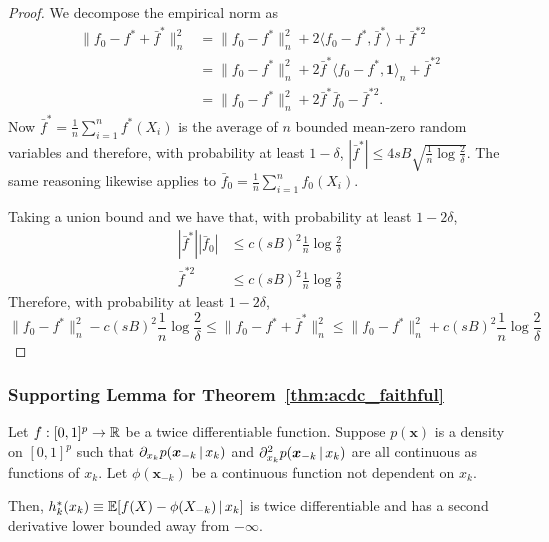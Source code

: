 \begin{proof}
We decompose the empirical norm as
\begin{align*}
\| f_0 - f^* + \bar{f}^* \|_n^2 &= \| f_0 - f^* \|_n^2 
    + 2 \langle f_0 - f^*, \bar{f}^* \rangle + \bar{f}^{*2} \\
  &= \| f_0 - f^* \|_n^2 + 2 \bar{f}^* \langle f_0 - f^*, \mathbf{1} \rangle_n + 
    \bar{f}^{*2} \\
  &= \| f_0 - f^* \|_n^2 + 2 \bar{f}^* \bar{f}_0 - \bar{f}^{*2}.
\end{align*}
Now
$\bar{f}^* = \frac{1}{n} \sum_{i=1}^n f^*(X_i)$ is the average of $n$ bounded mean-zero random variables and therefore, with probability at least $1-\delta$, $| \bar{f}^* | \leq 4 sB \sqrt{ \frac{1}{n} \log \frac{2}{\delta} }$.
The same reasoning likewise applies to $\bar{f}_0 = \frac{1}{n} \sum_{i=1}^n f_0(X_i)$.

Taking a union bound and we have that, with probability at least $1- 2\delta$, 
\begin{align*}
| \bar{f}^* | | \bar{f}_0 | &\leq c (sB)^2 \frac{1}{n} \log \frac{2}{\delta} \\
\bar{f}^{*2} &\leq c (sB)^2 \frac{1}{n} \log \frac{2}{\delta}
\end{align*}
Therefore, with probability at least $1 - 2\delta$,
\[
\|f_0 - f^*\|_n^2 - c (sB)^2 \frac{1}{n} \log \frac{2}{\delta} \leq
    \| f_0 - f^* + \bar{f}^* \|_n^2 \leq 
\|f_0 - f^*\|_n^2 + c (sB)^2 \frac{1}{n} \log \frac{2}{\delta}
\]
\end{proof}





 
\subsubsection{Supporting Lemma for Theorem~\ref{thm:acdc_faithful}}

\begin{lemma}
\label{lem:acdc_derivative_bound}
Let $f : [0,1]^p \rightarrow {\mathbb R}$ be a twice differentiable function. Suppose $p(\mathbf{x})$ is a density on $[0,1]^p$ such that $\partial_{x_k} p(\mbox{\boldmath $x$}_{-k} {\,|\,} x_k)$ and $\partial_{x_k}^2 p(\mbox{\boldmath $x$}_{-k} {\,|\,} x_k)$ are all continuous as functions of $x_k$. Let $\phi(\mathbf{x}_{-k})$ be a continuous function not dependent on $x_k$.

Then, $h^*_k(x_k) \equiv {\mathbb E}[ f(X) - \phi(X_{-k}) {\,|\,} x_k]$ is twice
differentiable and has a second derivative lower 
bounded away from $-\infty$.
\end{lemma}

